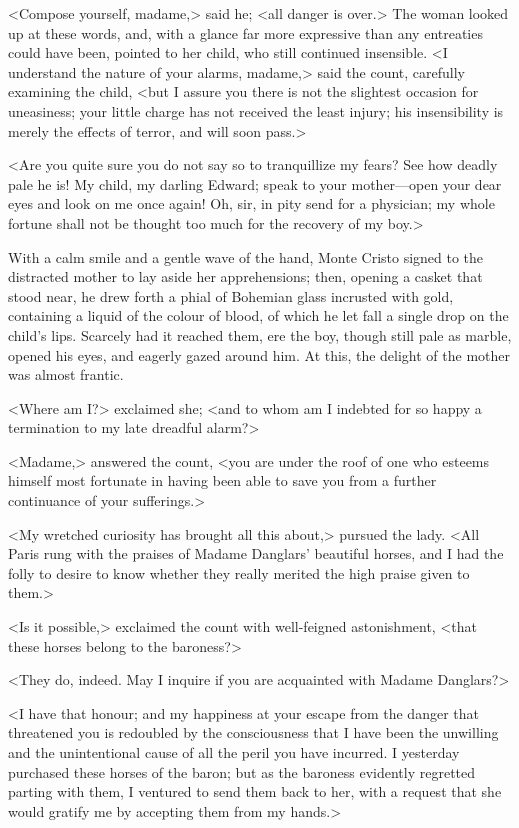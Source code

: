  <Compose yourself, madame,> said he; <all danger is over.> The woman looked up at these words, and, with a glance far more expressive than any entreaties could have been, pointed to her child, who still continued insensible. <I understand the nature of your alarms, madame,> said the count, carefully examining the child, <but I assure you there is not the slightest occasion for uneasiness; your little charge has not received the least injury; his insensibility is merely the effects of terror, and will soon pass.> 

 <Are you quite sure you do not say so to tranquillize my fears? See how deadly pale he is! My child, my darling Edward; speak to your mother—open your dear eyes and look on me once again! Oh, sir, in pity send for a physician; my whole fortune shall not be thought too much for the recovery of my boy.> 

 With a calm smile and a gentle wave of the hand, Monte Cristo signed to the distracted mother to lay aside her apprehensions; then, opening a casket that stood near, he drew forth a phial of Bohemian glass incrusted with gold, containing a liquid of the colour of blood, of which he let fall a single drop on the child's lips. Scarcely had it reached them, ere the boy, though still pale as marble, opened his eyes, and eagerly gazed around him. At this, the delight of the mother was almost frantic. 

 <Where am I?> exclaimed she; <and to whom am I indebted for so happy a termination to my late dreadful alarm?> 

 <Madame,> answered the count, <you are under the roof of one who esteems himself most fortunate in having been able to save you from a further continuance of your sufferings.> 

 <My wretched curiosity has brought all this about,> pursued the lady. <All Paris rung with the praises of Madame Danglars' beautiful horses, and I had the folly to desire to know whether they really merited the high praise given to them.> 

 <Is it possible,> exclaimed the count with well-feigned astonishment, <that these horses belong to the baroness?> 

 <They do, indeed. May I inquire if you are acquainted with Madame Danglars?>

<I have that honour; and my happiness at your escape from the danger that threatened you is redoubled by the consciousness that I have been the unwilling and the unintentional cause of all the peril you have incurred. I yesterday purchased these horses of the baron; but as the baroness evidently regretted parting with them, I ventured to send them back to her, with a request that she would gratify me by accepting them from my hands.> 

